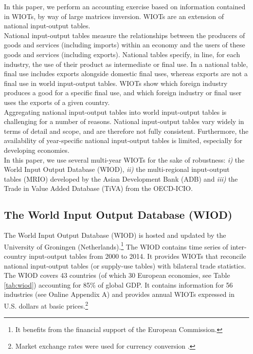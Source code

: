 \documentclass[11pt,a4paper]{paper} %
\begin{document}
In this paper, we perform an accounting exercise based on information contained in WIOTs, by way of large matrices inversion. 
WIOTs are an extension of national input-output tables. \\
National input-output tables measure the relationships between the producers of goods and services (including imports) within an economy and the users of these goods and services (including exports). 
National tables specify, in line, for each industry, the use of their product as intermediate or final use. 
In a national table, final use includes exports alongside domestic final uses, whereas exports are not a final use in world input-output tables. 
WIOTs show which foreign industry produces a good for a specific final use, and which foreign industry or final user uses the exports of a given country. \\
Aggregating national input-output tables into world input-output tables is challenging for a number of reasons. National input-output tables vary widely in terms of detail and scope, and are therefore not fully consistent. Furthermore, the availability of year-specific national input-output tables is limited, especially for developing economies. \\
In this paper, we use several multi-year WIOTs for the sake of robustness: \textit{i)} the World Input Output Database (WIOD), \textit{ii)} the multi-regional input-output tables (MRIO) developed by the Asian Development Bank (ADB) and \textit{iii)} the Trade in Value Added Database (TiVA) from the OECD-ICIO.

\subsection{The World Input Output Database (WIOD)} 
The World Input Output Database (WIOD) is hosted and updated by the University of Groningen (Netherlands).\footnote{It benefits from the financial support of the European Commission.}
The WIOD contains time series of inter-country input-output tables from 2000 to 2014. 
It provides WIOTs that reconcile national input-output tables (or supply-use tables) with bilateral trade statistics.
The WIOD covers 43 countries (of which 30 European economies, see Table \ref{tab:wiod}) accounting for 85\% of global GDP. 
It contains information for 56 industries (see Online Appendix A) and provides annual WIOTs expressed in U.S. dollars at basic prices.\footnote{Market exchange rates were used for currency conversion \citep{Timmer2015}.}
\end{document}
